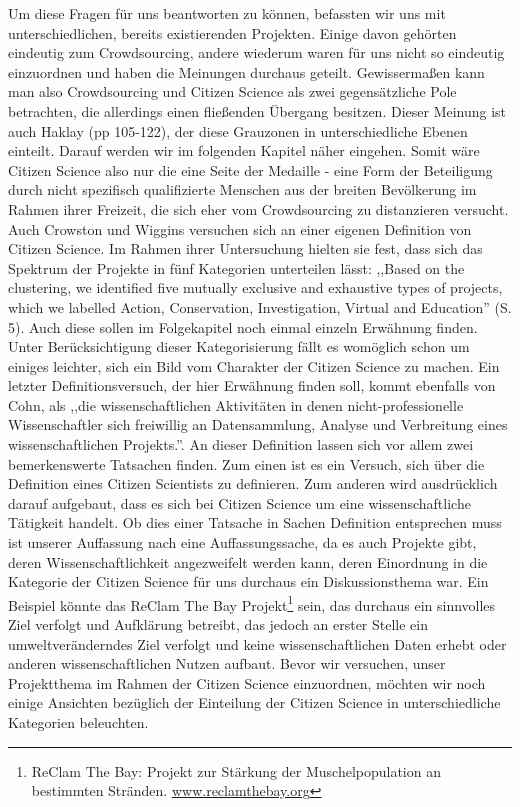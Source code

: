 \documentclass{article}
\begin{document}
Um diese Fragen für uns beantworten zu können, befassten wir uns mit unterschiedlichen, bereits existierenden Projekten.
Einige davon gehörten eindeutig zum Crowdsourcing, andere wiederum waren für uns nicht so eindeutig einzuordnen und haben die Meinungen durchaus geteilt.
Gewissermaßen kann man also Crowdsourcing und Citizen Science als zwei gegensätzliche Pole betrachten, die allerdings einen fließenden Übergang besitzen.
Dieser Meinung ist auch Haklay\cite{Haklay} (pp 105-122), der diese Grauzonen in unterschiedliche Ebenen einteilt.
Darauf werden wir im folgenden Kapitel näher eingehen.
Somit wäre Citizen Science also nur die eine Seite der Medaille
- eine Form der Beteiligung durch nicht spezifisch qualifizierte Menschen aus der breiten Bevölkerung im Rahmen ihrer Freizeit,
die sich eher vom Crowdsourcing zu distanzieren versucht.
\newline
Auch Crowston und Wiggins\cite{CW} versuchen sich an einer eigenen Definition von Citizen Science.
Im Rahmen ihrer Untersuchung hielten sie fest, dass sich das Spektrum der Projekte in fünf Kategorien unterteilen lässt:
,,Based on the clustering, we identified five mutually exclusive and exhaustive types of projects,
which we labelled Action, Conservation, Investigation, Virtual and Education'' (S. 5).
Auch diese sollen im Folgekapitel noch einmal einzeln Erwähnung finden.
Unter Berücksichtigung dieser Kategorisierung fällt es womöglich schon um einiges leichter,
sich ein Bild vom Charakter der Citizen Science zu machen.
Ein letzter Definitionsversuch, der hier Erwähnung finden soll, kommt ebenfalls von Cohn,
als ,,die wissenschaftlichen Aktivitäten in denen nicht-professionelle Wissenschaftler sich freiwillig an Datensammlung,
Analyse und Verbreitung eines wissenschaftlichen Projekts.''\cite{Cohn}.%
An dieser Definition lassen sich vor allem zwei bemerkenswerte Tatsachen finden. Zum einen ist es ein Versuch,
sich über die Definition eines Citizen Scientists zu definieren. Zum anderen wird ausdrücklich darauf aufgebaut,
dass es sich bei Citizen Science um eine wissenschaftliche Tätigkeit handelt.
Ob dies einer Tatsache in Sachen Definition entsprechen muss ist unserer Auffassung nach eine Auffassungssache,
da es auch Projekte gibt, deren Wissenschaftlichkeit angezweifelt werden kann,
deren Einordnung in die Kategorie der Citizen Science für uns durchaus ein Diskussionsthema war.
Ein Beispiel könnte das ReClam The Bay Projekt\footnote{ReClam The Bay: Projekt zur Stärkung der Muschelpopulation an bestimmten Stränden.
\url{www.reclamthebay.org}} sein, das durchaus ein sinnvolles Ziel verfolgt und Aufklärung betreibt,%
das jedoch an erster Stelle ein umweltveränderndes Ziel verfolgt und keine wissenschaftlichen Daten erhebt oder anderen wissenschaftlichen Nutzen aufbaut.
\newline
Bevor wir versuchen, unser Projektthema im Rahmen der Citizen Science einzuordnen,
möchten wir noch einige Ansichten bezüglich der Einteilung der Citizen Science in unterschiedliche Kategorien beleuchten.
\end{document}
